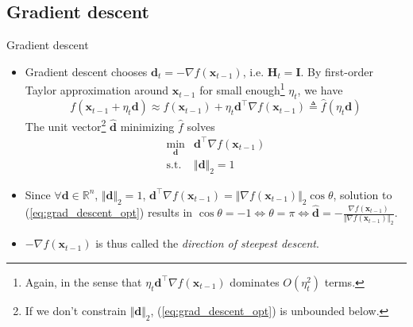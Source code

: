 \documentclass{beamer}
\numberwithin{equation}{section}
\newcommand{\aref}[1]{\alert{\ref{#1}}}
\begin{document}
\subsection{Gradient descent}

\begin{frame}{Gradient descent}
    \begin{itemize}
        \item
        Gradient descent chooses $ \mathbf{d}_t =
        -\nabla f(\mathbf{x}_{t - 1}) $, i.e. $ \mathbf{H}_t = \mathbf{I} $.
        By first-order Taylor approximation around $ \mathbf{x}_{t - 1} $ for
        small enough\footnote{
            Again, in the sense that $ \eta_t\mathbf{d}^\top
            \nabla f(\mathbf{x}_{t - 1}) $ dominates $ O(\eta_t^2) $ terms.
        } $ \eta_t $, we have
        \begin{equation*}
            f(\mathbf{x}_{t - 1} + \eta_t\mathbf{d}) \approx
            f(\mathbf{x}_{t - 1}) + \eta_t\mathbf{d}^\top
            \nabla f(\mathbf{x}_{t - 1}) \triangleq \hat{f}(\eta_t\mathbf{d})
        \end{equation*}
        The unit vector\footnote{
            If we don't constrain $ \Vert\mathbf{d}\Vert_2 $,
            (\aref{eq:grad_descent_opt}) is unbounded below.
        } $ \hat{\mathbf{d}} $ minimizing $ \hat{f} $ solves \cite{nocedal_opt}
        \begin{equation} \label{eq:grad_descent_opt}
            \begin{array}{ll}
                \displaystyle\min_{\mathbf{d}} &
                    \mathbf{d}^\top\nabla f(\mathbf{x}_{t - 1}) \\
                \text{s.t.} & \Vert\mathbf{d}\Vert_2 = 1
            \end{array}
        \end{equation}

        \item
        Since $ \forall \mathbf{d} \in \mathbb{R}^n $,
        $ \Vert\mathbf{d}\Vert_2 = 1 $, $ \mathbf{d}^\top
        \nabla f(\mathbf{x}_{t - 1}) = \Vert\nabla f(\mathbf{x}_{t - 1})\Vert_2
        \cos\theta $, solution to (\aref{eq:grad_descent_opt}) results in
        $ \cos\theta = -1 \Leftrightarrow \theta = \pi \Leftrightarrow
        \hat{\mathbf{d}} = -\frac{
            \nabla f(\mathbf{x}_{t - 1})
        }{\Vert\nabla f(\mathbf{x}_{t - 1})\Vert_2} $.

        \item
        $ -\nabla f(\mathbf{x}_{t - 1}) $ is thus called the
        \textit{direction of steepest descent}.
    \end{itemize}

    \medskip
\end{frame}
\end{document}
